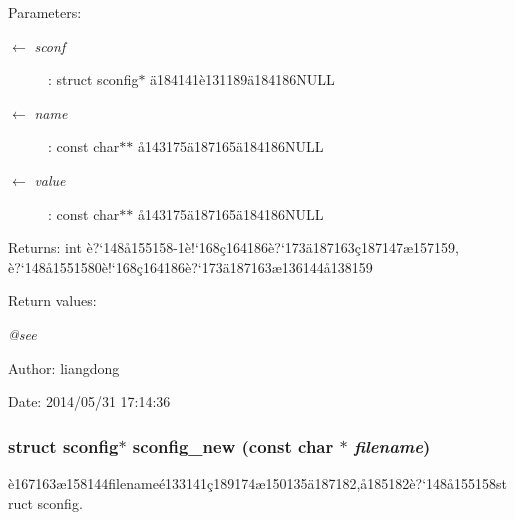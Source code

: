 \begin{Desc}
\item[Parameters:]
\begin{description}
\item[\mbox{$\leftarrow$} {\em sconf}]: struct sconfig$\ast$ \"{a}184141\`{e}131189\"{a}184186NULL \item[\mbox{$\leftarrow$} {\em name}]: const char$\ast$$\ast$ \aa{}143175\"{a}187165\"{a}184186NULL \item[\mbox{$\leftarrow$} {\em value}]: const char$\ast$$\ast$ \aa{}143175\"{a}187165\"{a}184186NULL \end{description}
\end{Desc}
\begin{Desc}
\item[Returns:]int \`{e}?`148\aa{}155158-1\`{e}!`168\c{c}164186\`{e}?`173\"{a}187163\c{c}187147\ae{}157159, \`{e}?`148\aa{}1551580\`{e}!`168\c{c}164186\`{e}?`173\"{a}187163\ae{}136144\aa{}138159 \end{Desc}
\begin{Desc}
\item[Return values:]
\begin{description}
\item[{\em @see}]\end{description}
\end{Desc}
\begin{Desc}
\item[Author:]liangdong \end{Desc}
\begin{Desc}
\item[Date:]2014/05/31 17:14:36 \end{Desc}
\subsubsection{\setlength{\rightskip}{0pt plus 5cm}struct sconfig$\ast$ sconfig\_\-new (const char $\ast$ {\em filename})}\label{sconfig_8c_a3}


\`{e}167163\ae{}158144filename\'{e}133141\c{c}189174\ae{}150135\"{a}187182,\aa{}185182\`{e}?`148\aa{}155158struct sconfig. 

